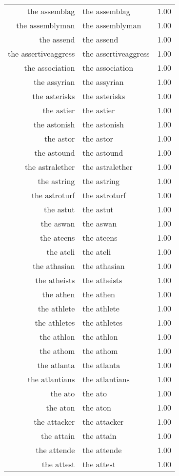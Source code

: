 \begin{table}[ht]
\begin{tabular}{rlr}
  the assemblag & the assemblag & 1.00 \\ 
  the assemblyman & the assemblyman & 1.00 \\ 
  the assend & the assend & 1.00 \\ 
  the assertiveaggress & the assertiveaggress & 1.00 \\ 
  the association & the association & 1.00 \\ 
  the assyrian & the assyrian & 1.00 \\ 
  the asterisks & the asterisks & 1.00 \\ 
  the astier & the astier & 1.00 \\ 
  the astonish & the astonish & 1.00 \\ 
  the astor & the astor & 1.00 \\ 
  the astound & the astound & 1.00 \\ 
  the astralether & the astralether & 1.00 \\ 
  the astring & the astring & 1.00 \\ 
  the astroturf & the astroturf & 1.00 \\ 
  the astut & the astut & 1.00 \\ 
  the aswan & the aswan & 1.00 \\ 
  the ateens & the ateens & 1.00 \\ 
  the ateli & the ateli & 1.00 \\ 
  the athasian & the athasian & 1.00 \\ 
  the atheists & the atheists & 1.00 \\ 
  the athen & the athen & 1.00 \\ 
  the athlete & the athlete & 1.00 \\ 
  the athletes & the athletes & 1.00 \\ 
  the athlon & the athlon & 1.00 \\ 
  the athom & the athom & 1.00 \\ 
  the atlanta & the atlanta & 1.00 \\ 
  the atlantians & the atlantians & 1.00 \\ 
  the ato & the ato & 1.00 \\ 
  the aton & the aton & 1.00 \\ 
  the attacker & the attacker & 1.00 \\ 
  the attain & the attain & 1.00 \\ 
  the attende & the attende & 1.00 \\ 
  the attest & the attest & 1.00 \\ 

\end{tabular}
\end{table}
